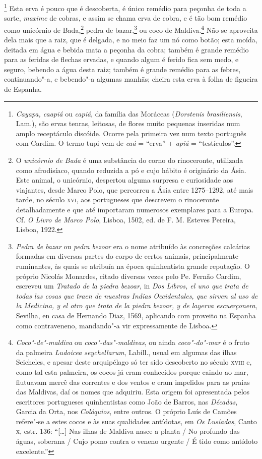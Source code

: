 \footnote{ \textit{Cayapa, caapiá} ou \textit{capiá},
da família das Moráceas (\textit{Dorstenis brasiliensis}, Lam.), são
ervas tenras, leitosas, de flores muito pequenas inseridas num amplo
receptáculo discóide. Ocorre pela primeira vez num texto português com
Cardim. O termo tupi vem de \textit{caá} = ``erva'' + \textit{apiá} = ``testículos''.} 
Esta erva é pouco que é descoberta, é único
remédio para peçonha de toda a sorte, \textit{maxime} de cobras, e assim se chama
erva de cobra, e é tão bom remédio como unicórnio de Bada,\footnote{ O
\textit{unicórnio de Bada} é uma substância do corno do rinoceronte,
utilizada como afrodisíaco, quando reduzida a pó e cujo hábito é
originário da Ásia. Este animal, o unicórnio, despertou alguma surpresa
e curiosidade aos viajantes, desde Marco Polo, que percorreu a Ásia
entre 1275--1292, até mais tarde, no século \textsc{xvi}, aos portugueses que
descrevem o rinoceronte detalhadamente e que até importaram numerosos
exemplares para a Europa. Cf. \textit{O Livro de Marco Polo}, Lisboa,
1502, ed. de F. M. Esteves Pereira, Lisboa, 1922.} pedra de 
bazar,\footnote{ \textit{Pedra de bazar} ou \textit{pedra bezoar} era o
nome atribuído às concreções calcárias formadas em diversas partes
do corpo de certos animais, principalmente ruminantes, às quais se
atribuía na época quinhentista grande reputação. O próprio Nicolás
Monardes, citado diversas vezes pelo Pe. Fernão Cardim, escreveu um
\textit{Tratado de la piedra bezoar}, in \textit{Dos Libros, el uno que
trata de todas las cosas que traen de nuestras Indias Occidentales,
que sirven al uso de la Medicina, y el otro que trata de la piedra
bezoar, y de layerva escuerçonera}, Sevilha, en casa de Hernando Diaz,
1569, aplicando com proveito na Espanha como contraveneno,
mandando"-a vir expressamente de Lisboa.} ou coco de 
Maldiva.\footnote{ \textit{Coco"-de"-maldiva} 
ou \textit{coco"-das"-maldivas}, ou ainda
\textit{coco"-do"-mar} é o fruto da palmeira \textit{Ludoicea
seychellarum}, Labill., usual em algumas das ilhas Seicheles, e apesar
deste arquipélago só ter sido descoberto no século \textsc{xviii} e, como tal
esta palmeira, os cocos já eram conhecidos porque caindo ao mar,
flutuavam mercê das correntes e dos ventos e eram impelidos para as
praias das Maldivas, daí os nomes que adquiriu. Esta origem foi
apresentada pelos escritores portugueses quinhentistas como João de
Barros, nas \textit{Décadas}, Garcia da Orta, nos \textit{Colóquios}, 
entre outros. O próprio Luís de Camões refere"-se a estes cocos e às
suas qualidades antídotas, em \textit{Os Lusíadas}, Canto \textsc{x}, estr. 136:
 ``[\ldots] Nas ilhas de Maldiva nasce a planta / No profundo das águas,
soberana / Cujo pomo contra o veneno urgente / É tido como antídoto
excelente.''} Não se aproveita dela mais que a raiz, que é delgada, e no
meio faz um nó como botão; esta moída, deitada em água e bebida mata a
peçonha da cobra; também é grande remédio para as feridas de flechas
ervadas, e quando algum é ferido fica sem medo, e seguro, bebendo a
água desta raiz; também é grande remédio para as febres, continuando"-a,
e bebendo"-a algumas manhãs; cheira esta erva à folha de figueira de Espanha.


